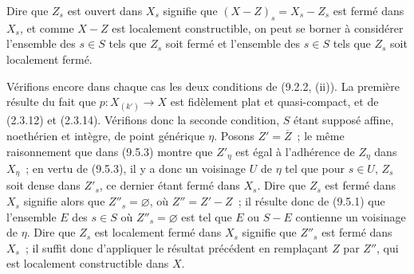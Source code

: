 Dire que $Z_s$ est ouvert dans $X_s$ signifie que
$(X-Z)_s=X_s-Z_s$ est fermé dans $X_s$, et comme $X-Z$ est localement
constructible, on peut se borner à considérer l'ensemble des $s\in S$ tels que
$Z_s$ soit fermé et l'ensemble des $s\in S$ tels que $Z_s$ soit localement
fermé.

Vérifions encore dans chaque cas les deux conditions de (9.2.2, (ii)). La
première résulte du fait que $p:X_{(k')}\to X$ est fidèlement plat et
quasi-compact, et de (2.3.12) et (2.3.14). Vérifions donc la seconde condition,
$S$ étant supposé affine, noethérien et intègre, de point générique $\eta$.
Posons $Z'=\overline Z$~; le même raisonnement que dans (9.5.3) montre que
$Z'_\eta$ est égal à l'adhérence de $Z_\eta$ dans $X_\eta$~; en vertu de
(9.5.3), il y a donc un voisinage $U$ de $\eta$ tel que pour $s\in U$, $Z_s$
soit dense dans $Z'_s$, ce dernier étant fermé dans $X_s$. Dire que $Z_s$ est
fermé dans $X_s$ signifie alors que $Z''_s=\varnothing$, où $Z''=Z'-Z$~; il
résulte donc de (9.5.1) que l'ensemble $E$ des $s\in S$ où
$Z''_s=\varnothing$ est tel que $E$ ou $S-E$ contienne un voisinage de
$\eta$. Dire que $Z_s$ est localement fermé dans $X_s$ signifie que $Z''_s$
est fermé dans $X_s$~; il suffit donc d'appliquer le résultat précédent en
remplaçant $Z$ par $Z''$, qui est localement constructible dans $X$.

